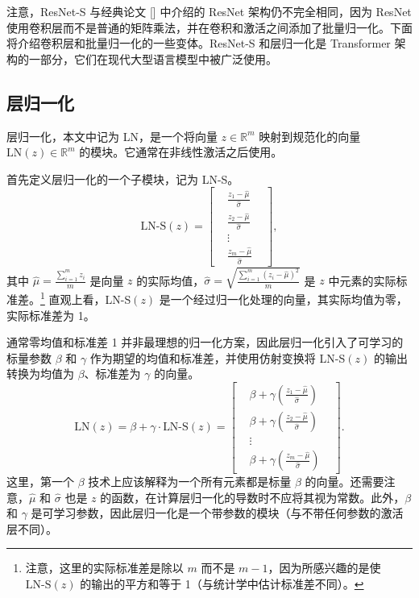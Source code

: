 注意，ResNet-S 与经典论文 [\cite{he2016resnet}] 中介绍的 ResNet 架构仍不完全相同，因为 ResNet 使用卷积层而不是普通的矩阵乘法，并在卷积和激活之间添加了批量归一化。下面将介绍卷积层和批量归一化的一些变体。ResNet-S 和层归一化是 Transformer 架构的一部分，它们在现代大型语言模型中被广泛使用。

\subsection*{层归一化}

层归一化，本文中记为 LN，是一个将向量 $z \in \mathbb{R}^m$ 映射到规范化的向量 $\text{LN}(z) \in \mathbb{R}^m$ 的模块。它通常在非线性激活之后使用。

首先定义层归一化的一个子模块，记为 LN-S。
\begin{equation}
    \text{LN-S}(z) = \begin{bmatrix}
        &\frac{z_1 - \hat{\mu}}{\hat{\sigma}}& \\
        &\frac{z_2 - \hat{\mu}}{\hat{\sigma}}& \\
        &\vdots& \\
        &\frac{z_m - \hat{\mu}}{\hat{\sigma}}&
    \end{bmatrix}, \label{eq:7.40}
\end{equation}
其中 $\hat{\mu} = \frac{\sum_{i=1}^m z_i}{m}$ 是向量 $z$ 的实际均值，$\hat{\sigma} = \sqrt{\frac{\sum_{i=1}^m (z_i - \hat{\mu})^2}{m}}$ 是 $z$ 中元素的实际标准差。\footnote{注意，这里的实际标准差是除以 $m$ 而不是 $m-1$，因为所感兴趣的是使 $\text{LN-S}(z)$ 的输出的平方和等于 1（与统计学中估计标准差不同）。} 直观上看，LN-S$(z)$ 是一个经过归一化处理的向量，其实际均值为零，实际标准差为 1。

通常零均值和标准差 1 并非最理想的归一化方案，因此层归一化引入了可学习的标量参数 $\beta$ 和 $\gamma$ 作为期望的均值和标准差，并使用仿射变换将 LN-S$(z)$ 的输出转换为均值为 $\beta$、标准差为 $\gamma$ 的向量。
\begin{equation}
    \text{LN}(z) = \beta + \gamma \cdot \text{LN-S}(z) = \begin{bmatrix}
        &\beta + \gamma \left(\frac{z_1 - \hat{\mu}}{\hat{\sigma}}\right)& \\
        &\beta + \gamma \left(\frac{z_2 - \hat{\mu}}{\hat{\sigma}}\right)& \\
        &\vdots& \\
        &\beta + \gamma \left(\frac{z_m - \hat{\mu}}{\hat{\sigma}}\right)&
    \end{bmatrix}. \label{eq:7.41}
\end{equation}
这里，第一个 $\beta$ 技术上应该解释为一个所有元素都是标量 $\beta$ 的向量。还需要注意，$\hat{\mu}$ 和 $\hat{\sigma}$ 也是 $z$ 的函数，在计算层归一化的导数时不应将其视为常数。此外，$\beta$ 和 $\gamma$ 是可学习参数，因此层归一化是一个带参数的模块（与不带任何参数的激活层不同）。

